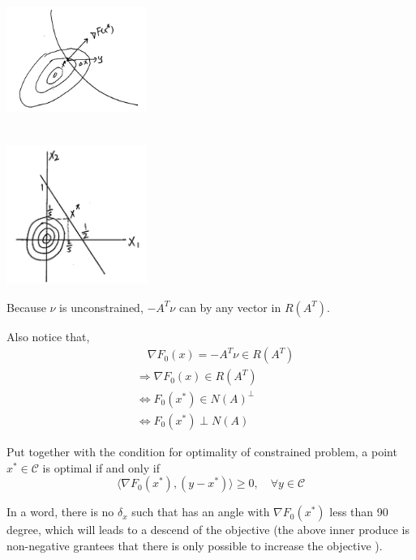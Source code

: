 \begin{marginfigure}
	\centering
	\includegraphics[width=1.8in,height=1.8in]{figures/ch10/figure1204_3.png}
\end{marginfigure}

\begin{marginfigure}
	\centering
	\includegraphics[width=1.8in,height=1.8in]{figures/ch10/figure1204_4.png}
\end{marginfigure}

Because $\nu$ is unconstrained, $-A^{T}\nu$ can by any vector in $R(A^T)$.

Also notice that,
\begin{align*}
&\quad \nabla F_0(x) = -A^T\nu\in R(A^T) \\
&\Rightarrow \nabla F_0(x)\in R(A^T) \\
&\Leftrightarrow F_0(x^*) \in N(A)^{\perp} \\
&\Leftrightarrow F_0(x^*) \perp N(A)
\end{align*}


Put together with the condition for optimality of constrained problem, a point $x^*\in\mathcal{C}$ is optimal if and only if 
$$\langle\nabla F_0(x^*), (y-x^*)\rangle\geq 0,\quad \forall y\in\mathcal{C}$$

In a word, there is no $\delta_x$ such that has an angle with $\nabla F_0(x^*)$ less than 90 degree, which will leads to a descend of the objective (the above inner produce is non-negative grantees that there is only possible to increase the objective ).









